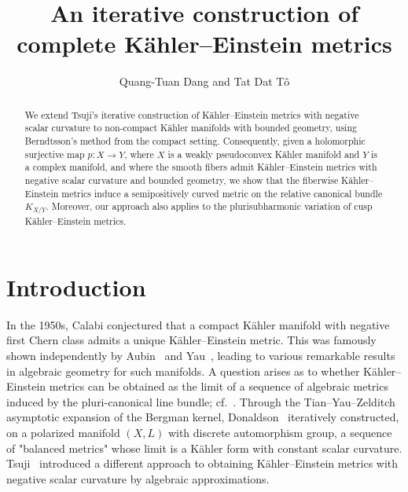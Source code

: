 \documentclass[a4paper, 11pt]{amsart}
\title[complete K\"ahler--Einstein metrics]{An iterative construction of  complete K\"ahler--Einstein metrics}
\author{Quang-Tuan Dang and Tat Dat T\^o}
\theoremstyle{plain}
\numberwithin{equation}{section} %
\numberwithin{figure}{section} %
\theoremstyle{plain}
\theoremstyle{plain}
\theoremstyle{plain}
\theoremstyle{plain}
\theoremstyle{remark}
\theoremstyle{definition}
\theoremstyle{definition}
\begin{document}
\begin{abstract}
 We extend Tsuji's iterative construction of Kähler--Einstein metrics with negative scalar curvature to non‑compact K\"ahler manifolds with bounded geometry, using Berndtsson's method from the compact setting. Consequently, given a holomorphic surjective map $p:X\to Y$, where $X$ is a weakly pseudoconvex K\"ahler manifold and $Y$ is a complex manifold, and where the smooth fibers admit K\"ahler--Einstein metrics with negative scalar curvature and bounded geometry, we show that the fiberwise K\"ahler--Einstein metrics induce a semipositively curved metric on the relative canonical bundle $K_{X/Y}$. Moreover, our approach also applies to the plurisubharmonic variation of cusp K\"ahler--Einstein metrics.
\end{abstract}

\maketitle

\section{Introduction}

In the 1950s, Calabi conjectured that a compact K\"ahler manifold with negative first Chern class admits a unique K\"ahler--Einstein metric. This was famously shown independently by Aubin~\cite{aubin1978equation} and Yau~\cite{yau1978ricci}, leading to various remarkable results in algebraic geometry for such manifolds. A question arises as to whether K\"ahler--Einstein metrics can be obtained as the limit of a sequence of algebraic metrics induced by the pluri-canonical line bundle; cf.~\cite{Yau87-nonlinear}. Through the Tian--Yau--Zelditch asymptotic expansion of the Bergman kernel,  Donaldson~\cite{Donaldson04-embeddings} iteratively constructed, on a polarized manifold $(X, L)$ with discrete automorphism group, a sequence of "balanced metrics" whose limit is a K\"ahler form with constant scalar curvature. Tsuji~\cite{Tsuji10-construction-KE} introduced a different approach 
to obtaining K\"ahler--Einstein metrics with negative scalar curvature by algebraic approximations. 
\end{document}
